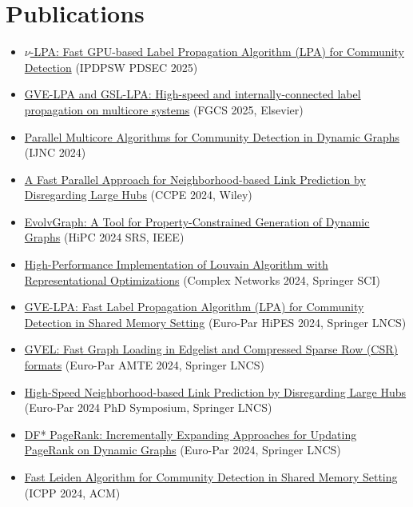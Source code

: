\section*{Publications}

\begin{itemize}[noitemsep, leftmargin=*]
  \item \href{https://arxiv.org/abs/2411.11468}{$\nu$-LPA: Fast GPU-based Label Propagation Algorithm (LPA) for Community Detection} (IPDPSW PDSEC 2025)
  \item \href{https://www.sciencedirect.com/science/article/pii/S0167739X25002912}{GVE-LPA and GSL-LPA: High-speed and internally-connected label propagation on multicore systems} (FGCS 2025, Elsevier)
  \item \href{https://www.jstage.jst.go.jp/article/ijnc/15/1/15_2/_article/-char/ja/}{Parallel Multicore Algorithms for Community Detection in Dynamic Graphs} (IJNC 2024)
  \item \href{https://onlinelibrary.wiley.com/doi/10.1002/cpe.8331}{A Fast Parallel Approach for Neighborhood-based Link Prediction by Disregarding Large Hubs} (CCPE 2024, Wiley)
  \item \href{https://ieeexplore.ieee.org/abstract/document/10898993}{EvolvGraph: A Tool for Property-Constrained Generation of Dynamic Graphs} (HiPC 2024 SRS, IEEE)
  \item \href{https://link.springer.com/chapter/10.1007/978-3-031-82435-7_11}{High-Performance Implementation of Louvain Algorithm with Representational Optimizations} (Complex Networks 2024, Springer SCI)
  \item \href{https://link.springer.com/chapter/10.1007/978-3-031-90203-1_9}{GVE-LPA: Fast Label Propagation Algorithm (LPA) for Community Detection in Shared Memory Setting} (Euro-Par HiPES 2024, Springer LNCS)
  \item \href{https://link.springer.com/chapter/10.1007/978-3-031-90200-0_22}{GVEL: Fast Graph Loading in Edgelist and Compressed Sparse Row (CSR) formats} (Euro-Par AMTE 2024, Springer LNCS)
  \item \href{https://link.springer.com/chapter/10.1007/978-3-031-90203-1_42}{High-Speed Neighborhood-based Link Prediction by Disregarding Large Hubs} (Euro-Par 2024 PhD Symposium, Springer LNCS)
  \item \href{https://link.springer.com/chapter/10.1007/978-3-031-69583-4_22}{DF* PageRank: Incrementally Expanding Approaches for Updating PageRank on Dynamic Graphs} (Euro-Par 2024, Springer LNCS)
  \item \href{https://dl.acm.org/doi/abs/10.1145/3673038.3673146}{Fast Leiden Algorithm for Community Detection in Shared Memory Setting} (ICPP 2024, ACM)

\end{itemize}

